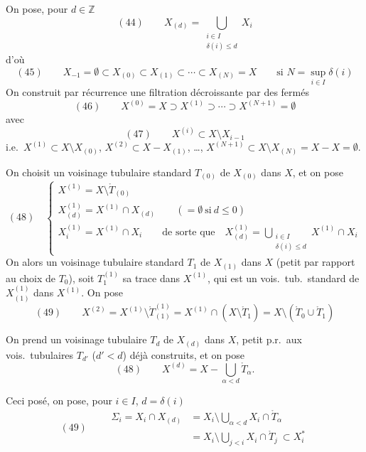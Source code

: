 \documentclass[11pt,a4paper]{article}
\begin{document}
On pose, pour $d\in\mathbb Z$
\[
(44)\qquad X_{(d)}=\bigcup_{\substack{i\in I\\ \delta(i)\le d}}X_i
\]
d'où
\[
(45)\qquad X_{-1}=\emptyset\subset X_{(0)}\subset X_{(1)}\subset\cdots\subset X_{(N)}=X\qquad\text{si } N=\sup_{i\in I}\delta(i)
\]
On construit par récurrence une filtration décroissante par des fermés
\[
(46)\qquad X^{(0)}=X\supset X^{(1)}\supset\cdots\supset X^{(N+1)}=\emptyset
\]
avec
\[
(47)\qquad X^{(i)}\subset X\setminus X_{i-1}
\]
i.e.\ $X^{(1)}\subset X\setminus X_{(0)}$, $X^{(2)}\subset X-X_{(1)}$, \ldots, $X^{(N+1)}\subset X\setminus X_{(N)}=X-X=\emptyset$.


On choisit un voisinage tubulaire standard $T_{(0)}$ de $X_{(0)}$ dans $X$, et on pose
\[
(48)\quad\left\lbrace
\begin{array}{l}
X^{(1)}=X\setminus\mathring T_{(0)}\\[4pt]
X^{(1)}_{(d)}=X^{(1)}\cap X_{(d)}\qquad(=\emptyset\ \text{si}\ d\le0)\\[4pt]
X^{(1)}_i=X^{(1)}\cap X_i\qquad\text{de sorte que}\quad X^{(1)}_{(d)}=\bigcup_{\substack{i\in I\\ \delta(i)\le d}}X^{(1)}\cap X_i
\end{array}\right.
\]
On   alors un voisinage tubulaire  standard $T_1$ de $X_{(1)}$ dans $X$ (petit par rapport au choix de $T_0$), soit $T^{(1)}_1$ sa trace dans $X^{(1)}$, qui est un vois.\ tub.\ standard de $X^{(1)}_{(1)}$ dans $X^{(1)}$. On pose
\[
(49)\qquad X^{(2)}=X^{(1)}\setminus\mathring T^{(1)}_{(1)}=X^{(1)}\cap(X\setminus\mathring T_1)=X\setminus(\mathring T_0\cup\mathring T_1)
\]

On prend un voisinage tubulaire $T_d$ de $X_{(d)}$ dans $X$, petit p.r.\ aux vois.\ tubulaires $T_{d'}$ ($d'<d$) déjà construits, et on pose
\[
(48)\qquad X^{(d)}=X-\bigcup_{\alpha<d}\mathring T_\alpha .
\]


Ceci posé, on pose, pour $i\in I$, $d=\delta(i)$
\[
(49)\qquad
\begin{aligned}
\Sigma_i=X_i\cap X_{(d)}&=X_i\setminus\bigcup_{\alpha<d}X_i\cap\mathring T_\alpha\\
&=X_i\setminus\bigcup_{j<i}X_i\cap\mathring T_j\ \subset X_i^{*}
\end{aligned}
\]
\end{document}
